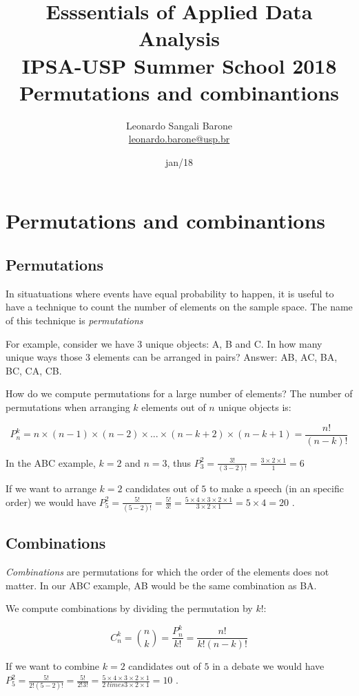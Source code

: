 \documentclass[11pt]{article}
\title{\textbf{Esssentials of Applied Data Analysis\\
				IPSA-USP Summer School 2018}\newline\\
				Permutations and combinantions}
\author{Leonardo Sangali Barone\\ \href{leonardo.barone@usp.br}{leonardo.barone@usp.br}}
\date{jan/18}
\begin{document}
\maketitle

\section*{Permutations and combinantions}


	\subsection*{Permutations}

	In situatuations where events have equal probability to happen, it is useful to have a technique to count the number of elements on the sample space. The name of this technique is \emph{permutations}

	For example, consider we have 3 unique objects: A, B and C. In how many unique ways those 3 elements can be arranged in pairs? Answer: {AB, AC, BA, BC, CA, CB}.
	
	How do we compute permutations for a large number of elements? The number of permutations when arranging $k$ elements out of $n$ unique objects is:
	
	\[P_n^k= n \times (n -1) \times (n-2) \times...\times (n-k+2) \times (n-k + 1) = \frac{n!}{(n-k)!} \]

	In the ABC example, $k = 2$ and $n = 3$, thus $P_3^2 = \frac{3!}{(3-2)!} = \frac{3 \times 2 \times 1}{1} = 6$ 		
	
	If we want to arrange $k = 2$ candidates out of $5$ to make a speech (in an specific order) we would have $P_5^2 = \frac{5!}{(5-2)!} = \frac{5!}{3!} = \frac{5 \times 4 \times 3 \times 2 \times 1}{3 \times 2 \times 1} = 5 \times 4 = 20$ .	
	
	\subsection*{Combinations}
	
	\emph{Combinations} are permutations for which the order of the elements does not matter. In our ABC example, AB would be the same combination as BA.

	We compute combinations by dividing the permutation by $k!$:
	
	\[C_n^k = \binom{n}{k} = \frac{P_n^k}{k!}  = \frac{n!}{k!(n-k)!} \]

	If we want to combine $k = 2$ candidates out of $5$ in a debate we would have $P_5^2 = \frac{5!}{2!(5-2)!} = \frac{5!}{2!3!} = \frac{5 \times 4 \times 3 \times 2 \times 1}{2 \ times3 \times 2 \times 1} = 10$ .	

	
\end{document}
